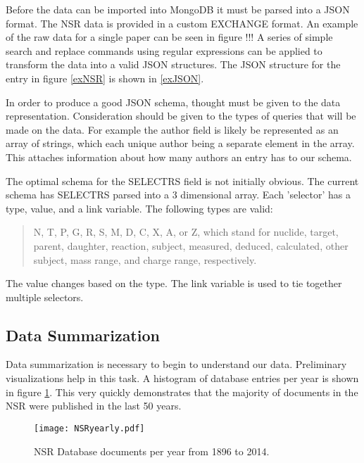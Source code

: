 \documentclass[12pt]{article}
\begin{document}
\begin{doublespacing}
Before the data can be imported into MongoDB it must be parsed into a JSON format.
The NSR data is provided in a custom EXCHANGE format. \citep{NSRhandbook}
An example of the raw data for a single paper can be seen in figure !!! %
A series of simple search and replace commands using regular expressions can be applied to transform the data into a valid JSON structures.
The JSON structure for the entry in figure \ref{exNSR} is shown in \ref{exJSON}. %

In order to produce a good JSON schema, thought must be given to the data representation.
Consideration should be given to the types of queries that will be made on the data.
For example the author field is likely be represented as an array of strings, which each unique author being a separate element in the array.
This attaches information about how many authors an entry has to our schema.

The optimal schema for the SELECTRS field is not initially obvious.
The current schema has SELECTRS parsed into a 3 dimensional array.
Each 'selector' has a type, value, and a link variable.
The following types are valid:
\begin{quote}
N, T, P, G, R, S, M, D, C, X, A, or Z, which stand for nuclide, target, parent, daughter, reaction, subject, measured, deduced, calculated, other subject, mass range, and charge range, respectively.
\end{quote}
The value changes based on the type. The link variable is used to tie together multiple selectors.

\subsection{Data Summarization}
Data summarization is necessary to begin to understand our data.
Preliminary visualizations help in this task.
A histogram of database entries per year is shown in figure \ref{fig:NSRyearly}.
This very quickly demonstrates that the majority of documents in the NSR were published in the last 50 years.

\begin{figure}[!hb]
    \label{fig:NSRyearly}
    \centering
    \texttt{[image: NSRyearly.pdf]}
    \caption{NSR Database documents per year from 1896 to 2014.}
\end{figure}



\end{doublespacing}
\end{document}
